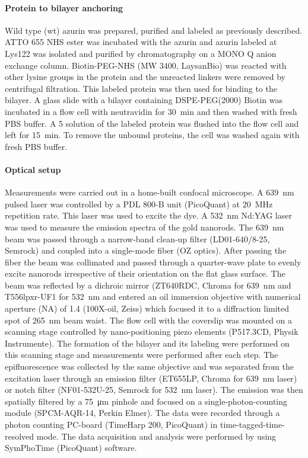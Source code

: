 \paragraph*{Protein to bilayer anchoring}
Wild type (wt) azurin was prepared, purified and labeled as previously described.\cite{VANDEKAMP1990283,nicolardi2012top-down}
ATTO 655 NHS ester was incubated with the azurin and azurin labeled at Lys122 was isolated and purified by chromatography on a MONO Q anion exchange column. 
Biotin-PEG-NHS (MW 3400, LaysanBio) was reacted with other lysine groups in the protein and the unreacted linkers were removed by centrifugal filtration.
This labeled protein was then used for binding to the bilayer.
A glass slide with a bilayer containing DSPE-PEG(2000) Biotin was incubated in a flow cell with neutravidin for \SI{30}{\minute} and then washed with fresh PBS buffer.
A \SI{5}{\nM} solution of the labeled protein was flushed into the flow cell and left for \SI{15}{\minute}.
To remove the unbound proteins, the cell was washed again with fresh PBS buffer.


\paragraph*{Optical setup}
Measurements were carried out in a home-built confocal microscope.
A \SI{639}{\nm} pulsed laser was controlled by a PDL 800-B unit (PicoQuant) at \SI{20}{\MHz} repetition rate.
This laser was used to excite the dye.
A \SI{532}{\nm} Nd:YAG laser was used to measure the emission spectra of the gold nanorods.
The \SI{639}{\nm} beam was passed through a narrow-band clean-up filter (LD01-640/8-25, Semrock) and coupled into a single-mode fiber (OZ optics).
After passing the fiber the beam was collimated and passed through a quarter-wave plate to evenly excite nanorods irrespective of their orientation on the flat glass surface.
The beam was reflected by a dichroic mirror (ZT640RDC, Chroma for \SI{639}{\nm} and T556lpxr-UF1 for \SI{532}{\nm} and entered an oil immersion objective with numerical aperture (NA) of 1.4 (100X-oil, Zeiss) which focused it to a diffraction limited spot of \SI{265}{\nm} beam waist.
The flow cell with the coverslip was mounted on a scanning stage controlled by nano-positioning piezo elements (P517.3CD, Physik Instrumente).
The formation of the bilayer and its labeling were performed on this scanning stage and measurements were performed after each step.
The epifluorescence was collected by the same objective and was separated from the excitation laser through an emission filter (ET655LP, Chroma for \SI{639}{\nm} laser) or 
notch filter (NF01-532U-25, Semrock for \SI{532}{\nm} laser).
The emission was then spatially filtered by a \SI{75}{\um} pinhole and focused on a single-photon-counting module (SPCM-AQR-14, Perkin Elmer).
The data were recorded through a photon counting PC-board (TimeHarp 200, PicoQuant) in time-tagged-time-resolved mode.
The data acquisition and analysis were performed by using SymPhoTime (PicoQuant) software.


